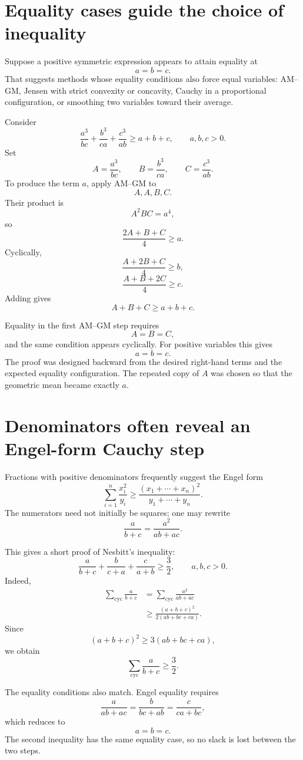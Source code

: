 \section{Equality cases guide the choice of inequality}

Suppose a positive symmetric expression appears to attain equality at
\[
  a=b=c.
\]
That suggests methods whose equality conditions also force equal variables: AM--GM, Jensen with strict convexity or concavity, Cauchy in a proportional configuration, or smoothing two variables toward their average.

Consider
\[
  \frac{a^3}{bc}
  +\frac{b^3}{ca}
  +\frac{c^3}{ab}
  \ge a+b+c,
  \qquad a,b,c>0.
\]
Set
\[
  A=\frac{a^3}{bc},
  \qquad
  B=\frac{b^3}{ca},
  \qquad
  C=\frac{c^3}{ab}.
\]
To produce the term \(a\), apply AM--GM to
\[
  A,A,B,C.
\]
Their product is
\[
  A^2BC=a^4,
\]
so
\[
  \frac{2A+B+C}{4}\ge a.
\]
Cyclically,
\[
  \frac{A+2B+C}{4}\ge b,
\]
\[
  \frac{A+B+2C}{4}\ge c.
\]
Adding gives
\[
  A+B+C\ge a+b+c.
\]

Equality in the first AM--GM step requires
\[
  A=B=C,
\]
and the same condition appears cyclically.  For positive variables this gives
\[
  a=b=c.
\]
The proof was designed backward from the desired right-hand terms and the expected equality configuration.  The repeated copy of \(A\) was chosen so that the geometric mean became exactly \(a\).

\section{Denominators often reveal an Engel-form Cauchy step}

Fractions with positive denominators frequently suggest the Engel form
\[
  \sum_{i=1}^n\frac{x_i^2}{y_i}
  \ge
  \frac{(x_1+\cdots+x_n)^2}{y_1+\cdots+y_n}.
\]
The numerators need not initially be squares; one may rewrite
\[
  \frac{a}{b+c}=\frac{a^2}{ab+ac}.
\]

This gives a short proof of Nesbitt's inequality:
\[
  \frac{a}{b+c}
  +\frac{b}{c+a}
  +\frac{c}{a+b}
  \ge\frac32,
  \qquad a,b,c>0.
\]
Indeed,
\[
\begin{aligned}
  \sum_{\mathrm{cyc}}\frac{a}{b+c}
  &=\sum_{\mathrm{cyc}}\frac{a^2}{ab+ac}\\
  &\ge
  \frac{(a+b+c)^2}{2(ab+bc+ca)}.
\end{aligned}
\]
Since
\[
  (a+b+c)^2\ge3(ab+bc+ca),
\]
we obtain
\[
  \sum_{\mathrm{cyc}}\frac{a}{b+c}\ge\frac32.
\]

The equality conditions also match.  Engel equality requires
\[
  \frac{a}{ab+ac}
  =\frac{b}{bc+ab}
  =\frac{c}{ca+bc},
\]
which reduces to
\[
  a=b=c.
\]
The second inequality has the same equality case, so no slack is lost between the two steps.

